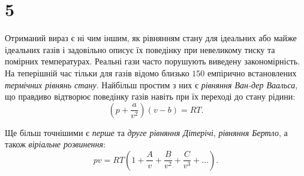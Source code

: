 \section{5}




Отриманий вираз є ні чим іншим, як рівнянням стану для ідеальних або майже ідеальних газів і задовільно описує їх поведінку при невеликому тиску та помірних температурах. Реальні гази часто порушують виведену закономірність. На теперішній час тільки для газів відомо близько $150$ емпірично встановлених \emph{термічних рівнянь стану}. Найбільш простим з них є \emph{рівняння Ван-дер Ваальса}, що правдиво відтворює поведінку газів навіть при їх переході до стану рідини:
\begin{equation}\label{eq:VanDerVaals}
    \left(p + \frac{a}{v^2}\right)(v - b) = RT.
\end{equation}

Ще більш точнішими є \emph{перше} та \emph{друге рівняння Дітерічі}, \emph{рівняння Бертло}, а також \emph{віріальне розвинення}:
\begin{equation}\label{eq:virial}
        pv = RT \left(1 + \frac{A}{v} + \frac{B}{v^2} + \frac{C}{v^3} + \ldots \right).
\end{equation}

